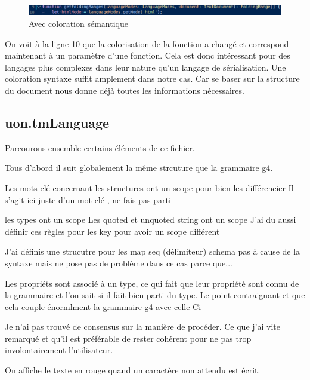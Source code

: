 \documentclass[
    iict, %
    il, %
]{heig-tb}
\begin{document}
\begin{figure}[!h]
    \begin{center}
        \includegraphics[width=15cm]{assets/figures/semantic-coloration-with.png}
    \end{center}
    \caption[Sans coloration sémantique ]{\label{semantic-coloration-with} Avec coloration sémantique }
\end{figure}

On voit à la ligne 10 que la colorisation de la fonction a changé et correspond maintenant à un paramètre d'une fonction.
Cela est donc intéressant pour des langages plus complexes dans leur nature qu'un langage de sérialisation. Une coloration syntaxe suffit amplement dans notre cas.
Car se baser sur la structure du document nous donne déjà toutes les informations nécessaires.

\subsection{uon.tmLanguage}

Parcourons ensemble certains éléments de ce fichier.

Tous d'abord il suit globalement la même strcuture que la grammaire g4.

Les mots-clé concernant les structures ont un scope pour bien les différencier
Il s'agit ici juste d'un mot clé , ne fais pas parti

les types ont un scope
Les quoted et unquoted string ont un scope
J'ai du aussi définir ces règles pour les key pour avoir un scope différent

J'ai définis une strucutre pour les map seq (délimiteur) schema pas à cause de la syntaxe mais ne pose pas de problème dans ce cas parce que...

Les propriéts sont associé à un type, ce qui fait que leur propriété sont connu de la grammaire et l'on sait si il fait bien parti du type.
Le point contraignant et que cela couple énormlment la grammaire g4 avec celle-Ci


Je n'ai pas trouvé de consensus sur la manière de procéder. Ce que j'ai vite remarqué et qu'il est préférable de rester cohérent pour ne pas
trop involontairement l'utilisateur.


On affiche le texte en rouge quand un caractère non attendu est écrit.
\end{document}
